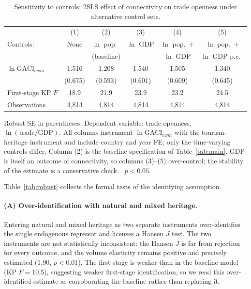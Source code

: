 \begin{table}[H]
\centering
\caption{Sensitivity to controls: 2SLS effect of connectivity on trade
openness under alternative control sets.}
\label{tab:controls}
\begin{threeparttable}
\small
\begin{tabular}{lccccc}
\toprule
 & (1) & (2) & (3) & (4) & (5) \\
Controls: & None & $\ln$ pop.\ & $\ln$ GDP & $\ln$ pop.\ $+$ & $\ln$ pop.\ $+$ \\
 & & (baseline) & & $\ln$ GDP & $\ln$ GDP p.c.\ \\
\midrule
$\ln\mathrm{GACI}_{cwm}$ & 1.516\sym{**} & 1.208\sym{**} & 1.540\sym{**} & 1.505\sym{**} & 1.340\sym{**} \\
  & (0.675) & (0.593) & (0.601) & (0.609) & (0.645) \\
\midrule
First-stage KP $F$ & 18.9 & 21.9 & 23.9 & 23.2 & 24.5 \\
Observations & 4{,}814 & 4{,}814 & 4{,}814 & 4{,}814 & 4{,}814 \\
\bottomrule
\end{tabular}
\begin{tablenotes}\small
\item Robust SE in parentheses. Dependent variable: trade openness,
$\ln(\text{trade}/\text{GDP})$. All columns instrument $\ln\mathrm{GACI}_{cwm}$
with the tourism-heritage instrument and include country and year FE; only the
time-varying controls differ. Column (2) is the baseline specification of
Table~\ref{tab:main}. GDP is itself an outcome of connectivity, so columns
(3)--(5) over-control; the stability of the estimate is a conservative check.
\sym{**}~$p<0.05$.
\end{tablenotes}
\end{threeparttable}
\end{table}

Table~\ref{tab:robust} collects the formal tests of the identifying assumption.

\paragraph{(A) Over-identification with natural and mixed heritage.} Entering
natural and mixed heritage as two separate instruments over-identifies
the single endogenous regressor and licenses a Hansen $J$ test. The two
instruments are not statistically inconsistent: the Hansen $J$ is far from
rejection for every outcome, and the volume
elasticity remains positive and precisely estimated ($1.90$, $p<0.01$). The first stage is weaker than in the baseline model (KP $F=10.5$), suggesting weaker first-stage
identification, so we read this over-identified estimate as corroborating the
baseline rather than replacing it.

